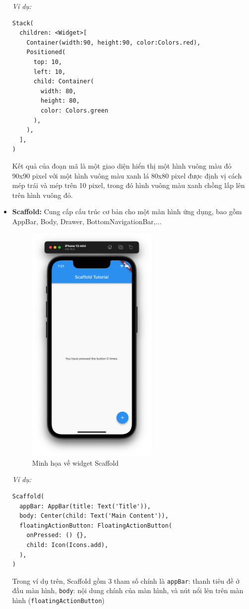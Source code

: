 \documentclass[../DoAn.tex]{subfiles}
\numberwithin{figure}{chapter}
\begin{document}
\begin{itemize}
\textit{Ví dụ:}
\begin{lstlisting}
Stack(
  children: <Widget>[
    Container(width:90, height:90, color:Colors.red),
    Positioned(
      top: 10,
      left: 10,
      child: Container(
        width: 80, 
        height: 80, 
        color: Colors.green
      ),
    ),
  ],
)
\end{lstlisting}

Kết quả của đoạn mã là một giao diện hiển thị một hình vuông màu đỏ 90x90 pixel với một hình vuông màu xanh lá 80x80 pixel được định vị cách mép trái và mép trên 10 pixel, trong đó hình vuông màu xanh chồng lấp lên trên hình vuông đỏ.

\item \textbf{Scaffold:} Cung cấp cấu trúc cơ bản cho một màn hình ứng dụng, bao gồm AppBar, Body, Drawer, BottomNavigationBar,...

\begin{figure}[H]
    \centering
    \includegraphics[width=0.6\textwidth]{Hinhve/Chuong5/scaffold.png}
    \caption{Minh họa về widget Scaffold}
    \label{fig:scaffold}
\end{figure}

\textit{Ví dụ:}
\begin{lstlisting}
Scaffold(
  appBar: AppBar(title: Text('Title')),
  body: Center(child: Text('Main Content')),
  floatingActionButton: FloatingActionButton(
    onPressed: () {},
    child: Icon(Icons.add),
  ),
)    
\end{lstlisting}

Trong ví dụ trên, Scaffold gồm 3 tham số chính là \texttt{appBar}: thanh tiêu đề ở đầu màn hình, \texttt{body}: nội dung chính của màn hình, và nút nổi lên trên màn hình (\texttt{floatingActionButton})
\end{itemize}
\end{document}
